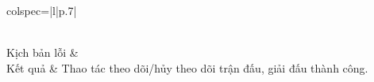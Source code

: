 \begin{longtblr}[caption = {Đặc tả usecase Theo dõi trận đấu, giải đấu},
  label = {tab:usecase5-spec},]{colspec={|l|p{.7\linewidth}|}}
\begin{minipage}{\linewidth}
\begin{enumerate}[label={\textbf{\textcolor{red}{A\arabic*}} --}, align=left, itemsep=-5pt]
    \end{enumerate}
    \vskip 1pt
  \end{minipage}
  \\\hline
  Kịch bản lỗi         &                                                                                                                       \\\hline
  Kết quả              & Thao tác theo dõi/hủy theo dõi trận đấu, giải đấu thành công.                                                         \\\hline
\end{longtblr}
